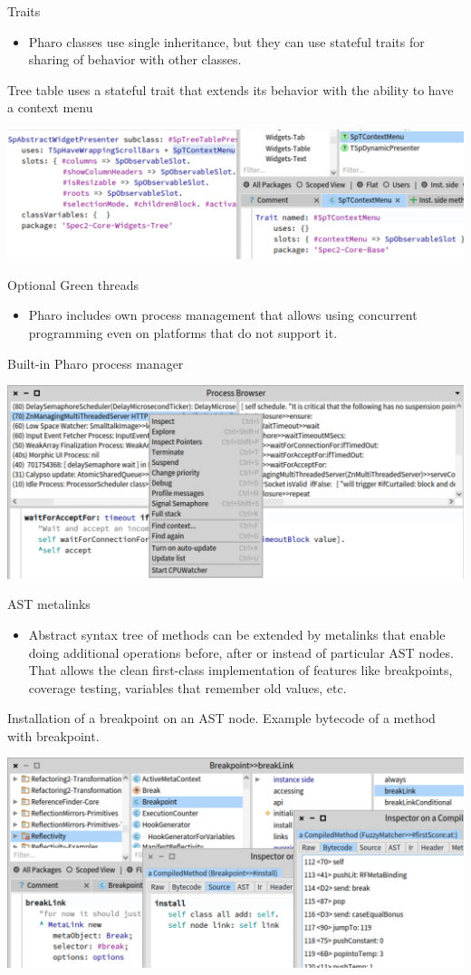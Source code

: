 \documentclass{beamer}
\begin{document}
\begin{frame}{Traits}
\begin{itemize}
    \item Pharo classes use single inheritance, but they can use stateful traits for sharing of behavior with other classes.
\end{itemize}
\begin{block}{}
Tree table uses a stateful trait that extends its behavior with the ability to have a context menu
\end{block}
\includegraphics[width=0.5\linewidth]{traits.png}
\end{frame}

\begin{frame}{Optional Green threads}
\begin{itemize}
    \item Pharo includes own process management that allows using concurrent programming even on platforms that do not support it.
\end{itemize}
\begin{block}{}
Built-in Pharo process manager
\end{block}
\includegraphics[width=0.5\linewidth]{processes.png}
\end{frame}

\begin{frame}{AST metalinks}
\begin{itemize}
    \item Abstract syntax tree of methods can be extended by metalinks that enable doing additional operations before, after or instead of particular AST nodes. That allows the clean first-class implementation of features like breakpoints, coverage testing, variables that remember old values, etc.
\end{itemize}
 \begin{block}{}
Installation of a breakpoint on an AST node. Example bytecode of a method with breakpoint.
 \end{block}
\includegraphics[width=0.5\linewidth]{metalinks.png}
\end{frame}
\end{document}

